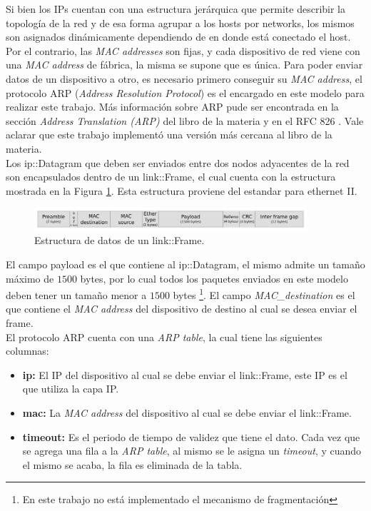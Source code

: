 \documentclass[10pt,a4paper]{article}
\begin{document}
Si bien los IPs cuentan con una estructura jerárquica que permite describir la topología de la red y de esa forma agrupar a los hosts por networks, los mismos son asignados dinámicamente dependiendo de en donde está conectado el host. Por el contrario, las \textit{MAC addresses} son fijas, y cada dispositivo de red viene con una \textit{MAC address} de fábrica, la misma se supone que es única. Para poder enviar datos de un dispositivo a otro, es necesario primero conseguir su \textit{MAC address}, el protocolo ARP (\textit{Address Resolution Protocol}) es el encargado en este modelo para realizar este trabajo. Más información sobre ARP pude ser encontrada en la sección \textit{Address Translation (ARP)} del libro de la materia \cite[p.~228]{peterson2011computer} y en el RFC 826 \cite{plummer1982ethernet}. Vale aclarar que este trabajo implementó una versión más cercana al libro de la materia.\\

Los ip::Datagram que deben ser enviados entre dos nodos adyacentes de la red son encapsulados dentro de un link::Frame, el cual cuenta con la estructura mostrada en la Figura \ref{figure: frame structure}. Esta estructura proviene del estandar para ethernet II. \\

\begin{figure}[!htb]
    \centering
    \includegraphics[width = 0.9\textwidth]{img/png/l2-frame.png}
    \caption{Estructura de datos de un link::Frame.}
    \label{figure: frame structure}
\end{figure}

El campo payload es el que contiene al ip::Datagram, el mismo admite un tamaño máximo de $1500$ bytes, por lo cual todos los paquetes enviados en este modelo deben tener un tamaño menor a $1500$ bytes \footnote{En este trabajo no está implementado el mecanismo de fragmentación}. El campo \textit{MAC\_destination} es el que contiene el \textit{MAC address} del dispositivo de destino al cual se desea enviar el frame.\\

El protocolo ARP cuenta con una \textit{ARP table}, la cual tiene las siguientes columnas:

\begin{itemize}
\item \textbf{ip:} El IP del dispositivo al cual se debe enviar el link::Frame, este IP es el que utiliza la capa IP.
\item \textbf{mac:} La \textit{MAC address} del dispositivo al cual se debe enviar el link::Frame.
\item \textbf{timeout:} Es el periodo de tiempo de validez que tiene el dato. Cada vez que se agrega una fila a la \textit{ARP table}, al mismo se le asigna un \textit{timeout}, y cuando el mismo se acaba, la fila es eliminada de la tabla.
\end{itemize}
\end{document}
